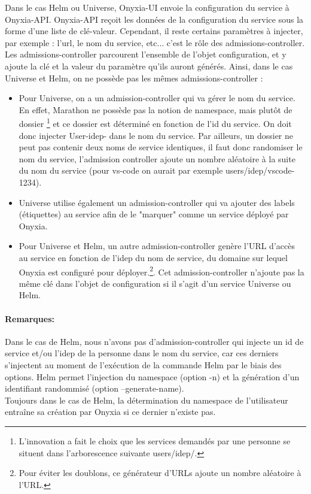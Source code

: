 \documentclass[11pt,fleqn]{book} %
\begin{document}
\vspace{-0.5cm}
Dans le cas Helm ou Universe, Onyxia-UI envoie la configuration du service à Onyxia-API. Onyxia-API reçoit les données de la configuration du service sous la forme d'une liste de clé-valeur. Cependant, il reste certains paramètres à injecter, par exemple : l'url, le nom du service, etc... c'est le rôle des admissions-controller.\\

Les admissions-controller parcourent l'ensemble de l'objet configuration, et y ajoute la clé et la valeur du paramètre qu'ils auront générés. Ainsi, dans le cas Universe et Helm, on ne possède pas les mêmes admissions-controller : \\
\begin{itemize}
    \item Pour Universe, on a un admission-controller qui va gérer le nom du service. En effet, Marathon ne possède pas la notion de namespace, mais plutôt de dossier \footnote{L'innovation a fait le choix que les services demandés par une personne se situent dans l'arborescence suivante users/idep/.} et ce dossier est déterminé en fonction de l'id du service. On doit donc injecter User-idep- dans le nom du service. Par ailleurs, un dossier ne peut pas contenir deux noms de service identiques, il faut donc randomiser le nom du service, l'admission controller ajoute un nombre aléatoire à la suite du nom du service (pour vs-code on aurait par exemple users/idep/vscode-1234).\\
    
    \item Universe utilise également un admission-controller qui va ajouter des labels (étiquettes) au service afin de le "marquer" comme un service déployé par Onyxia. \\
    
    \item Pour Universe et Helm, un autre admission-controller genère l'URL d'accès au service en fonction de l'idep du nom de service, du domaine sur lequel Onyxia est configuré pour déployer.\footnote{Pour éviter les doublons, ce générateur d'URLs ajoute un nombre aléatoire à l'URL.}. Cet admission-controller n'ajoute pas la même clé dans l'objet de configuration si il s'agit d'un service Universe ou Helm.\\
\end{itemize}
\vspace{-1cm}
\begin{interrupt}
\paragraph{Remarques:}
 Dans le cas de Helm, nous n'avons pas d'admission-controller qui injecte un id de service et/ou l'idep de la personne dans le nom du service, car ces derniers s'injectent au moment de l'exécution de la commande Helm par le biais des options. Helm permet l'injection du namespace (option -n) et la génération d'un identifiant randommisé (option --generate-name). \\
 
 Toujours dans le cas de Helm, la détermination du namespace de l'utilisateur entraîne sa création par Onyxia si ce dernier n'existe pas.
\end{interrupt}
\end{document}
